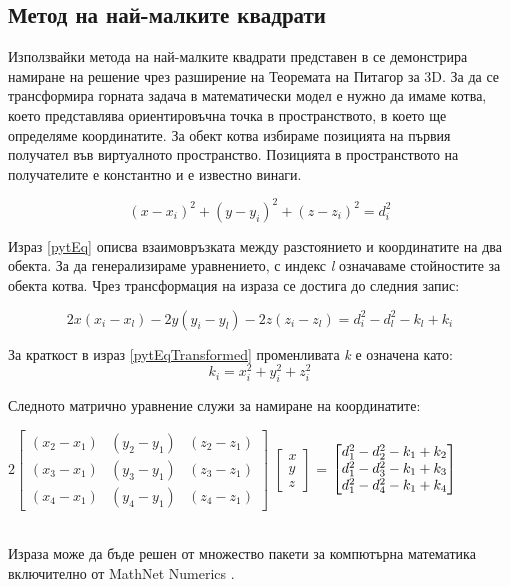 \subsection{Метод на най-малките квадрати} \label{squares_algorithm}

Използвайки метода на най-малките квадрати представен в \cite{leastsq} се демонстрира намиране на решение чрез разширение на Теоремата на Питагор за 3D. За да се трансформира горната задача в математически модел е нужно да имаме котва\cite{leastsq2}, което представлява ориентировъчна точка в пространството, в което ще определяме координатите. За обект котва избираме позицията на първия получател във виртуалното пространство. Позицията в пространството на получателите е константно и е известно винаги.


\begin{equation} \label{pytEq}
   (x-x_i)^2 + (y-y_i)^2 + (z-z_i)^2=d_i^2
\end{equation}

Израз \ref{pytEq} описва взаимовръзката между разстоянието и координатите на два обекта. За да генерализираме уравнението, с индекс \textit{l} означаваме стойностите за обекта котва. Чрез трансформация на израза се достига до следния запис:

\begin{equation} \label{pytEqTransformed}
  2 x (x_i - x_l) - 2 y (y_i - y_l) - 2  z  (z_i - z_l) = d^2_i - d^2_l - k_l + k_i
\end{equation}

За краткост в израз \ref{pytEqTransformed} променливата \textit{k} е означена като: 
\begin{equation} \label{kdesc}
    k_i= x^2_i + y^2_i + z^2_i
\end{equation}

Следното матрично уравнение служи за намиране на координатите:\\

\centerline{
    $
    2 \begin{bmatrix}
        (x_2-x_1) & (y_2 - y_1) & (z_2 - z_1)\\
        (x_3-x_1) & (y_3 - y_1) & (z_3 - z_1)\\
        (x_4-x_1) & (y_4 - y_1) & (z_4 - z_1)
    \end{bmatrix}
    $
    $
    \begin{bmatrix}
        x\\y\\z
    \end{bmatrix}
    $
    =
    $
    \begin{bmatrix}
        d^2_1 - d^2_2 - k_1 + k_2\\
        d^2_1 - d^2_3 - k_1 + k_3\\
        d^2_1 - d^2_4 - k_1 + k_4\\
    \end{bmatrix}\\
    $
}\\

Израза може да бъде решен от множество пакети за компютърна математика включително от MathNet Numerics \cite{numerics}.